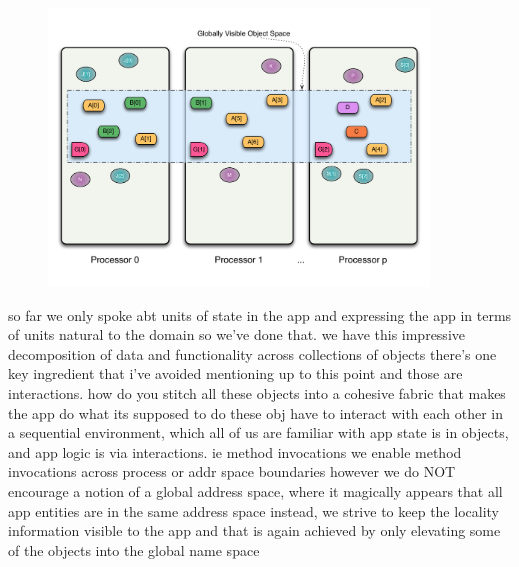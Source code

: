\begin{frame}
  \frametitle{
  }
  \begin{figure}\includegraphics[width=0.9\textwidth]{../figures/progmodel/07-obj-programmer-view.pdf}\end{figure}
\end{frame}


\begin{frame}
so far we only spoke abt units of state in the app
and expressing the app in terms of units natural to the domain
so we've done that.
we have this impressive decomposition of data and functionality across collections of objects
there's one key ingredient that i've avoided mentioning up to this point
and those are interactions.
how do you stitch all these objects into a cohesive fabric that makes the app do what its supposed
to do
these obj have to interact with each other
in a sequential environment, which all of us are familiar with
app state is in objects, and app logic is via interactions. ie method invocations
we enable method invocations across process or addr space boundaries
however we do NOT encourage a notion of a global address space, where it magically appears that
all app entities are in the same address space
instead, we strive to keep the locality information visible to the app
and that is again achieved by only elevating some of the objects into the global name space
\end{frame}


